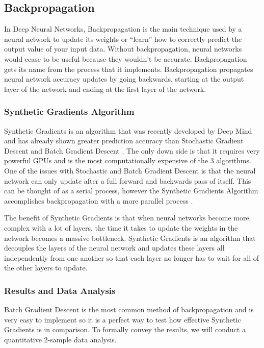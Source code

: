 \documentclass[draftclsnofoot, onecolumn, 10pt, compsoc]{IEEEtran}
\begin{document}
		\subsection{Backpropagation}
			In Deep Neural Networks, Backpropagation is the main technique used by a neural network to update its weights or “learn” how to correctly predict the output value of your input data. Without backpropagation, neural networks would cease to be useful because they wouldn’t be accurate. Backpropagation gets its name from the process that it implements. Backpropagation propagates neural network accuracy updates by going backwards, starting at the output layer of the network and ending at the first layer of the network.

			\subsubsection{Synthetic Gradients Algorithm}
				Synthetic Gradients is an algorithm that was recently developed by Deep Mind and has already shown greater prediction accuracy than Stochastic Gradient Descent and Batch Gradient Descent \cite{Raval}. The only down side is that it requires very powerful GPUs and is the most computationally expensive of the 3 algorithms. One of the issues with Stochastic and Batch Gradient Descent is that the neural network can only update after a full forward and backwards pass of itself. This can be thought of as a serial process, however the Synthetic Gradients Algorithm accomplishes backpropagation with a more parallel process \cite{Czarnecki}.

				The benefit of Synthetic Gradients is that when neural networks become more complex with a lot of layers, the time it takes to update the weights in the network becomes a massive bottleneck. Synthetic Gradients is an algorithm that decouples the layers of the neural network and updates these layers all independently from one another so that each layer no longer has to wait for all of the other layers to update.

			\subsubsection{Results and Data Analysis}
				Batch Gradient Descent is the most common method of backpropagation and is very easy to implement so it is a perfect way to test how effective Synthetic Gradients is in comparison. To formally convey the results, we will conduct a quantitative 2-sample data analysis.
\end{document}
